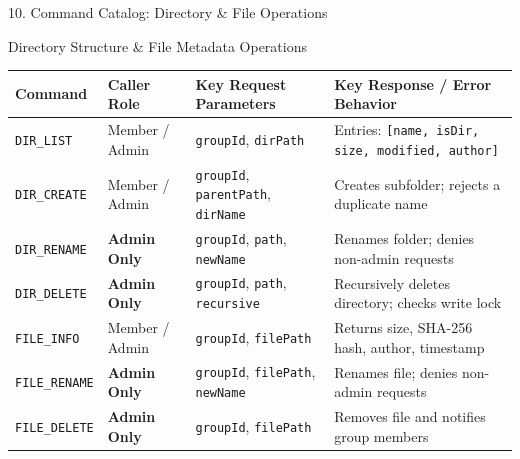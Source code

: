 \documentclass[t, aspectratio=169]{beamer}
\begin{document}
\begin{frame}{10. Command Catalog: Directory \& File Operations}
\small
\begin{block}{Directory Structure \& File Metadata Operations}
\end{block}
\vspace{-4pt}
\centering
\scriptsize
\setlength{\tabcolsep}{3pt}
\renewcommand{\arraystretch}{1.0}
\begin{tabularx}{\textwidth}{llp{4.2cm}X}
\toprule
\textbf{Command} & \textbf{Caller Role} & \textbf{Key Request Parameters} & \textbf{Key Response / Error Behavior} \\
\midrule
\texttt{DIR\_LIST} & Member / Admin & \texttt{groupId}, \texttt{dirPath} & Entries: \texttt{[name, isDir, size, modified, author]} \\
\texttt{DIR\_CREATE} & Member / Admin & \texttt{groupId}, \texttt{parentPath}, \texttt{dirName} & Creates subfolder; rejects a duplicate name \\
\texttt{DIR\_RENAME} & \textbf{Admin Only} & \texttt{groupId}, \texttt{path}, \texttt{newName} & Renames folder; denies non-admin requests \\
\texttt{DIR\_DELETE} & \textbf{Admin Only} & \texttt{groupId}, \texttt{path}, \texttt{recursive} & Recursively deletes directory; checks write lock \\
\midrule
\texttt{FILE\_INFO} & Member / Admin & \texttt{groupId}, \texttt{filePath} & Returns size, SHA-256 hash, author, timestamp \\
\texttt{FILE\_RENAME} & \textbf{Admin Only} & \texttt{groupId}, \texttt{filePath}, \texttt{newName} & Renames file; denies non-admin requests \\
\texttt{FILE\_DELETE} & \textbf{Admin Only} & \texttt{groupId}, \texttt{filePath} & Removes file and notifies group members \\
\bottomrule
\end{tabularx}
\end{frame}
\end{document}
